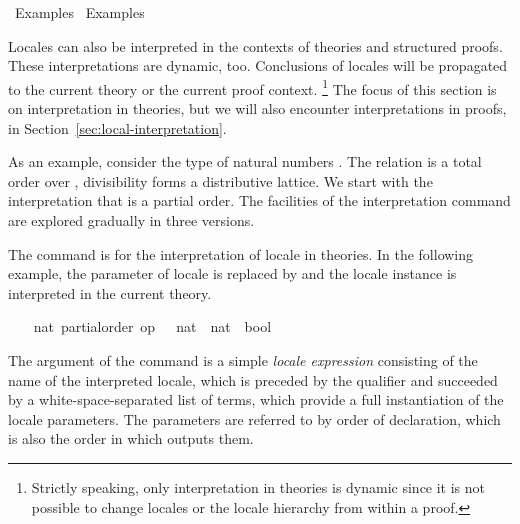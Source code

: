 %
\begin{isabellebody}%
\def\isabellecontext{Examples{\isadigit{1}}}%
%
\isadelimtheory
%
\endisadelimtheory
%
\isatagtheory
{}\isamarkupfalse%
\ Examples{}\isanewline
{}\ Examples\isanewline
{}%
\endisatagtheory
{\isafoldtheory}%
%
\isadelimtheory
%
\endisadelimtheory
%
\isamarkuptrue%
%
\begin{isamarkuptext}%
Locales can also be interpreted in the contexts of theories and
  structured proofs.  These interpretations are dynamic, too.
  Conclusions of locales will be propagated to the current theory or
  the current proof context.%
\footnote{Strictly speaking, only interpretation in theories is
  dynamic since it is not possible to change locales or the locale
  hierarchy from within a proof.}
  The focus of this section is on
  interpretation in theories, but we will also encounter
  interpretations in proofs, in
  Section~\ref{sec:local-interpretation}.

  As an example, consider the type of natural numbers .  The
  relation  is a total order over ,
  divisibility  forms a distributive lattice.  We start with the
  interpretation that  is a partial order.  The facilities of
  the interpretation command are explored gradually in three versions.%
\end{isamarkuptext}%
\isamarkuptrue%
%
\isamarkuptrue%
%
\begin{isamarkuptext}%
The command  is for the interpretation of
  locale in theories.  In the following example, the parameter of locale
   is replaced by  and the locale instance is interpreted in the current
  theory.%
\end{isamarkuptext}%
\isamarkuptrue%
%
\isadelimvisible
\ \ %
\endisadelimvisible
%
\isatagvisible
{}\isamarkupfalse%
\ nat{\isacharcolon}\ partial{\isacharunderscore}order\ {\isachardoublequoteopen}op\ {\isasymle}\ {\isacharcolon}{\isacharcolon}\ nat\ {\isasymRightarrow}\ nat\ {\isasymRightarrow}\ bool{\isachardoublequoteclose}%
\begin{isamarkuptxt}%
\normalsize
  The argument of the command is a simple \emph{locale expression}
  consisting of the name of the interpreted locale, which is
  preceded by the qualifier  and succeeded by a
  white-space-separated list of terms, which provide a full
  instantiation of the locale parameters.  The parameters are referred
  to by order of declaration, which is also the order in which
   outputs them.


\end{isamarkuptxt}
\end{isabellebody}
